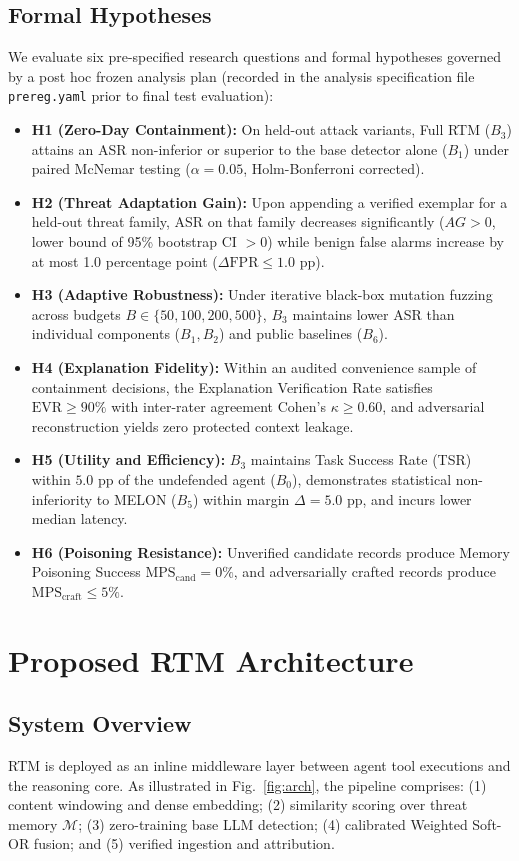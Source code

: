 \documentclass[conference]{IEEEtran}
\begin{document}
\subsection{Formal Hypotheses}
We evaluate six pre-specified research questions and formal hypotheses governed by a post hoc frozen analysis plan (recorded in the analysis specification file \texttt{prereg.yaml} prior to final test evaluation):
\begin{itemize}
    \item \textbf{H1 (Zero-Day Containment):} On held-out attack variants, Full RTM ($B_3$) attains an ASR non-inferior or superior to the base detector alone ($B_1$) under paired McNemar testing ($\alpha = 0.05$, Holm-Bonferroni corrected).
    \item \textbf{H2 (Threat Adaptation Gain):} Upon appending a verified exemplar for a held-out threat family, ASR on that family decreases significantly ($AG > 0$, lower bound of 95\% bootstrap CI $> 0$) while benign false alarms increase by at most 1.0 percentage point ($\Delta\text{FPR} \le 1.0\text{ pp}$).
    \item \textbf{H3 (Adaptive Robustness):} Under iterative black-box mutation fuzzing across budgets $B \in \{50, 100, 200, 500\}$, $B_3$ maintains lower ASR than individual components ($B_1, B_2$) and public baselines ($B_6$).
    \item \textbf{H4 (Explanation Fidelity):} Within an audited convenience sample of containment decisions, the Explanation Verification Rate satisfies $\text{EVR} \ge 90\%$ with inter-rater agreement Cohen's $\kappa \ge 0.60$, and adversarial reconstruction yields zero protected context leakage.
    \item \textbf{H5 (Utility and Efficiency):} $B_3$ maintains Task Success Rate (TSR) within $5.0\text{ pp}$ of the undefended agent ($B_0$), demonstrates statistical non-inferiority to MELON ($B_5$) within margin $\Delta = 5.0\text{ pp}$, and incurs lower median latency.
    \item \textbf{H6 (Poisoning Resistance):} Unverified candidate records produce Memory Poisoning Success $\text{MPS}_{\text{cand}} = 0\%$, and adversarially crafted records produce $\text{MPS}_{\text{craft}} \le 5\%$.
\end{itemize}

\section{Proposed RTM Architecture}
\subsection{System Overview}
RTM is deployed as an inline middleware layer between agent tool executions and the reasoning core. As illustrated in Fig.~\ref{fig:arch}, the pipeline comprises: (1) content windowing and dense embedding; (2) similarity scoring over threat memory $\mathcal{M}$; (3) zero-training base LLM detection; (4) calibrated Weighted Soft-OR fusion; and (5) verified ingestion and attribution.
\end{document}
